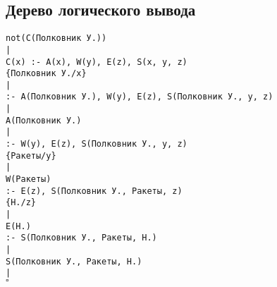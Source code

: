 \documentclass[titlepage,10pt,a4paper]{article}
\begin{document}
\subsection{Дерево логического вывода}
\begin{center}
\verb'not(C(Полковник У.))'\\
\verb'|'\\
\verb'C(x) :- A(x), W(y), E(z), S(x, y, z)'\\
\verb'{Полковник У./x}'\\
\verb'|'\\
\verb':- A(Полковник У.), W(y), E(z), S(Полковник У., y, z)'\\
\verb'|'\\
\verb'A(Полковник У.)'\\
\verb'|'\\
\verb':- W(y), E(z), S(Полковник У., y, z)'\\
\verb'{Ракеты/y}'\\
\verb'|'\\
\verb'W(Ракеты)'\\
\verb':- E(z), S(Полковник У., Ракеты, z)'\\
\verb'{Н./z}'\\
\verb'|'\\
\verb'E(Н.)'\\
\verb':- S(Полковник У., Ракеты, Н.)'\\
\verb'|'\\
\verb'S(Полковник У., Ракеты, Н.)'\\
\verb'|'\\
$\square$

\end{center}
\end{document}
